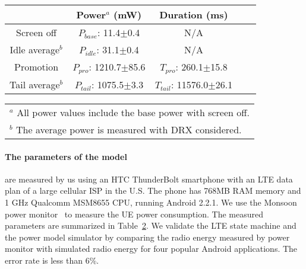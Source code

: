\begin{table}[t]
\begin{center}
\small
\begin{tabular}{|c|c|c|c|c|}\hline
            & Power$^{a}$ (mW)        & Duration (ms) \\
\hline
Screen off       & $P_{base}$: 11.4$\pm$0.4      & N/A       \\
Idle average$^{b}$   & $P_{idle}$: 31.1$\pm$0.4      & N/A       \\
Promotion   & $P_{pro}$: 1210.7$\pm$85.6   & $T_{pro}$: 260.1$\pm$15.8 \\
Tail average$^{b}$        & $P_{tail}$: 1075.5$\pm$3.3    & $T_{tail}$: 11576.0$\pm$26.1 \\
\hline
\end{tabular}
\begin{tabular}{l}
\\{\small $^a$} All power values include the base power with screen off.
\\{\small $^b$} The average power is measured with DRX considered.
\end{tabular}
\label{tab:lte_para}
\end{center}
\end{table}

\paragraph{The parameters of the model} are measured by us using an HTC ThunderBolt smartphone with an LTE data plan of a large cellular ISP in the U.S. The phone has 768MB RAM memory and 1 GHz Qualcomm MSM8655 CPU, running Android 2.2.1. We use the Monsoon power monitor~\cite{monsoon} to measure the UE power consumption.
The measured parameters are summarized in Table~\ref{tab:lte_para}. We validate the LTE state machine and the power model simulator by comparing the radio energy measured by power monitor with simulated radio energy for four popular Android applications. The error rate is less than 6\%.

